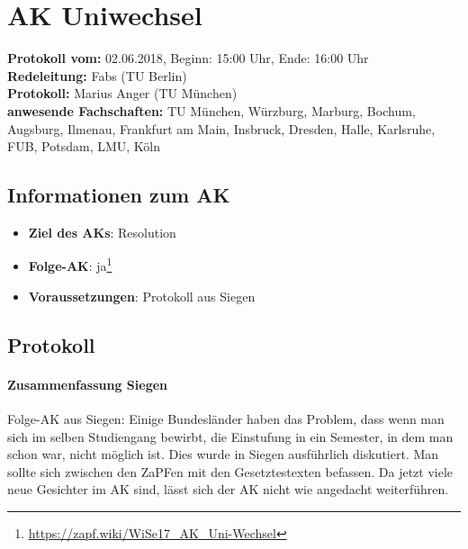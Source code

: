 
\section{AK Uniwechsel}

  \textbf{Protokoll vom:} 02.06.2018, %
  Beginn: 15:00 Uhr,
  Ende: 16:00 Uhr \\
  \textbf{Redeleitung:} Fabs (TU Berlin) \\
  \textbf{Protokoll:} Marius Anger (TU München) \\
  \textbf{anwesende Fachschaften:} TU München, Würzburg, Marburg, Bochum, Augsburg, Ilmenau, Frankfurt am Main, Insbruck, Dresden, Halle, Karlsruhe, FUB, Potsdam, LMU, Köln

  \subsection*{Informationen zum AK}
    \begin{itemize}
      \item \textbf{Ziel des AKs}: Resolution
      \item \textbf{Folge-AK}: ja\footnote{\url{https://zapf.wiki/WiSe17_AK_Uni-Wechsel}}
      \item \textbf{Voraussetzungen}: Protokoll aus Siegen
    \end{itemize}

  \subsection*{Protokoll}
      \paragraph{Zusammenfassung Siegen}
        Folge-AK aus Siegen: Einige Bundesländer haben das Problem, dass wenn man sich im selben Studiengang bewirbt, die Einstufung in ein Semester, in dem man schon war, nicht möglich ist.
        Dies wurde in Siegen ausführlich diskutiert. Man sollte sich zwischen den ZaPFen mit den Gesetztestexten befassen. Da jetzt viele neue Gesichter im AK sind, lässt sich der AK nicht wie angedacht weiterführen.

